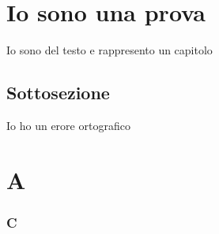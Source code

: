 \section{Io sono una prova}

Io sono del testo e rappresento un capitolo

\subsection{Sottosezione}

Io ho un erore ortografico

\section{A}
\subsubsection{C}

